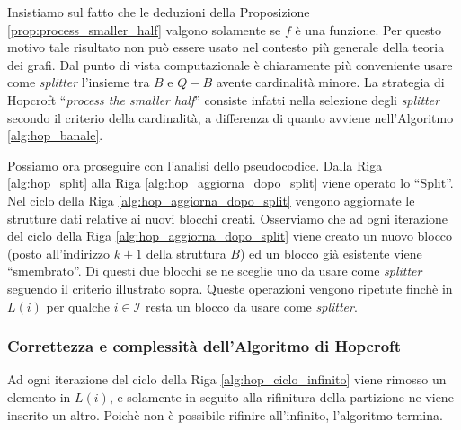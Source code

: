 Insistiamo sul fatto che le deduzioni della Proposizione \ref{prop:process_smaller_half} valgono solamente se $f$ è una funzione. Per questo motivo tale risultato non può essere usato nel contesto più generale della teoria dei grafi. Dal punto di vista computazionale è chiaramente più conveniente usare come \emph{splitter} l'insieme tra $B$ e $Q - B$ avente cardinalità minore. La strategia di Hopcroft ``\emph{process the smaller half}'' consiste infatti nella selezione degli \emph{splitter} secondo il criterio della cardinalità, a differenza di quanto avviene nell'Algoritmo \ref{alg:hop_banale}.

Possiamo ora proseguire con l'analisi dello pseudocodice. Dalla Riga \ref{alg:hop_split} alla Riga \ref{alg:hop_aggiorna_dopo_split} viene operato lo ``Split''. Nel ciclo della Riga \ref{alg:hop_aggiorna_dopo_split} vengono aggiornate le strutture dati relative ai nuovi blocchi creati. Osserviamo che ad ogni iterazione del ciclo della Riga \ref{alg:hop_aggiorna_dopo_split} viene creato un nuovo blocco (posto all'indirizzo $k+1$ della struttura $B$) ed un blocco già esistente viene ``smembrato''. Di questi due blocchi se ne sceglie uno da usare come \emph{splitter} seguendo il criterio illustrato sopra. Queste operazioni vengono ripetute finchè in $L(i)$ per qualche $i \in \mathcal{I}$ resta un blocco da usare come \emph{splitter}.

\subsubsection{Correttezza e complessità dell'Algoritmo di Hopcroft} Ad ogni iterazione del ciclo della Riga \ref{alg:hop_ciclo_infinito} viene rimosso un elemento in $L(i)$, e solamente in seguito alla rifinitura della partizione ne viene inserito un altro. Poichè non è possibile rifinire all'infinito, l'algoritmo termina.

